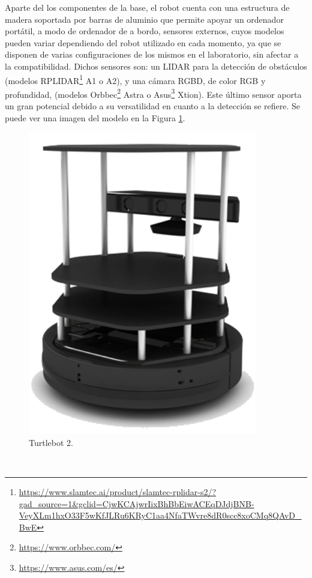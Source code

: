 Aparte del los componentes de la base, el robot cuenta con una estructura de
madera soportada por barras de aluminio que permite apoyar un ordenador
portátil, a modo de ordenador de a bordo, sensores externos, cuyos modelos
pueden variar dependiendo del robot utilizado en cada momento, ya que se
disponen de varias configuraciones de los mismos en el laboratorio, sin afectar
a la compatibilidad.
Dichos sensores son: un LIDAR para la detección de obstáculos (modelos
RPLIDAR\footnote{\url{https://www.slamtec.ai/product/slamtec-rplidar-s2/?gad_source=1&gclid=CjwKCAjwrIixBhBbEiwACEqDJdjBNB-VeyXLm1hxO33F5wKfJLRu6KRyC1aa4NfaTWvre8dR0scc8xoCMq8QAvD_BwE}}
A1 o A2), y una cámara RGBD, de color RGB y profundidad, (modelos
Orbbec\footnote{\url{https://www.orbbec.com/}} Astra o
Asus\footnote{\url{https://www.asus.com/es/}} Xtion).
Este último sensor aporta un gran potencial debido a su versatilidad en cuanto a
la detección se refiere.
Se puede ver una imagen del modelo en la Figura \ref{fig:turtlebot2}.

\begin{figure} [h!]
  \begin{center}
    \includegraphics[width=10cm]{figs/turtlebot2}
  \end{center}
  \caption{Turtlebot 2.}
  \label{fig:turtlebot2}
\end{figure}\


